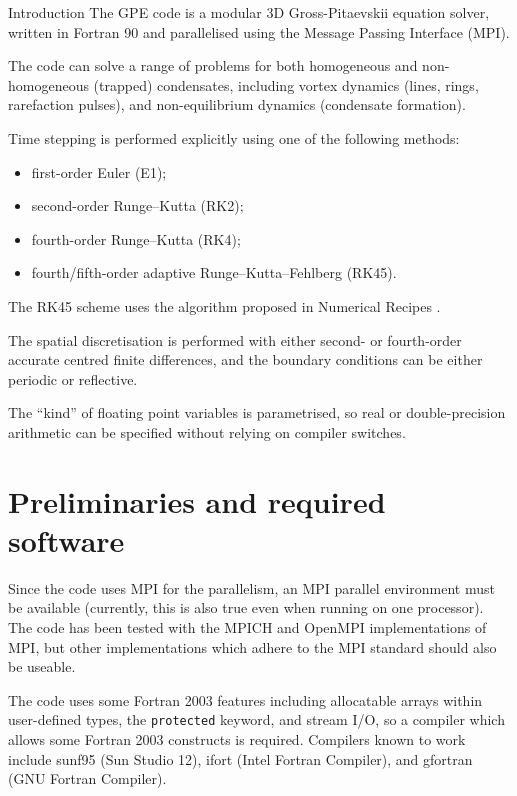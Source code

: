 
\begin{chapter}{\label{cha:introduction}Introduction}
  The GPE code is a modular 3D Gross-Pitaevskii equation solver, written in
  Fortran 90 and parallelised using the Message Passing Interface (MPI).
  
  The code can solve a range of problems for both homogeneous and
  non-homogeneous (trapped) condensates, including vortex dynamics (lines,
  rings, rarefaction pulses), and non-equilibrium dynamics (condensate
  formation).

  Time stepping is performed explicitly using one of the following methods:
  \begin{itemize}
    \item first-order Euler (E1);
    \item second-order Runge--Kutta (RK2);
    \item fourth-order Runge--Kutta (RK4);
    \item fourth/fifth-order adaptive Runge--Kutta--Fehlberg (RK45).
  \end{itemize}
  The RK45 scheme uses the algorithm proposed in Numerical Recipes
  \citep[section 16.2, page 708,][]{NR92}.
  
  The spatial discretisation is performed with either second- or fourth-order
  accurate centred finite differences, and the boundary conditions can be
  either periodic or reflective.

  The ``kind'' of floating point variables is parametrised, so real or
  double-precision arithmetic can be specified without relying on compiler
  switches.

  \section{\label{sec:prelim}Preliminaries and required software}
  Since the code uses MPI for the parallelism, an MPI parallel environment must
  be available (currently, this is also true even when running on one
  processor).  The code has been tested with the MPICH and OpenMPI
  implementations of MPI, but other implementations which adhere to the MPI
  standard should also be useable.

  The code uses some Fortran 2003 features including allocatable arrays within
  user-defined types, the \verb"protected" keyword, and stream I/O, so a
  compiler which allows some Fortran 2003 constructs is required.  Compilers
  known to work include sunf95 (Sun Studio 12), ifort (Intel Fortran Compiler),
  and gfortran (GNU Fortran Compiler).


\end{chapter}

